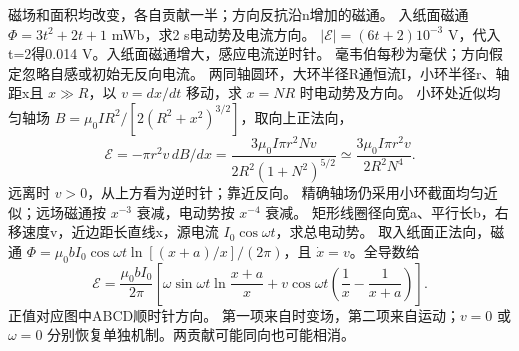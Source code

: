 \crosscheck 磁场和面积均改变，各自贡献一半；方向反抗沿n增加的磁通。
\problemtext 入纸面磁通 $\Phi=3t^2+2t+1$ mWb，求2 s电动势及电流方向。
\workings $|\mathcal E|=(6t+2)10^{-3}$ V，代入t=2得0.014 V。入纸面磁通增大，感应电流逆时针。
\crosscheck 毫韦伯每秒为毫伏；方向假定忽略自感或初始无反向电流。
\problemtext 两同轴圆环，大环半径R通恒流I，小环半径r、轴距x且 $x\gg R$，以 $v=dx/dt$ 移动，求 $x=NR$ 时电动势及方向。
\workings 小环处近似均匀轴场 $B=\mu_0IR^2/[2(R^2+x^2)^{3/2}]$，取向上正法向，
\[
\mathcal E=-\pi r^2 v\,dB/dx
=\frac{3\mu_0I\pi r^2Nv}{2R^2(1+N^2)^{5/2}}
\simeq\frac{3\mu_0I\pi r^2v}{2R^2N^4}.
\]
远离时 $v>0$，从上方看为逆时针；靠近反向。
\crosscheck 精确轴场仍采用小环截面均匀近似；远场磁通按 $x^{-3}$ 衰减，电动势按 $x^{-4}$ 衰减。
\problemtext 矩形线圈径向宽a、平行长b，右移速度v，近边距长直线x，源电流 $I_0\cos\omega t$，求总电动势。
\workings 取入纸面正法向，磁通 $\Phi=\mu_0b I_0\cos\omega t\ln[(x+a)/x]/(2\pi)$，且 $\dot x=v$。全导数给
\[
\mathcal E=\frac{\mu_0 b I_0}{2\pi}
\left[\omega\sin\omega t\ln\frac{x+a}{x}
+v\cos\omega t\left(\frac1x-\frac1{x+a}\right)\right].
\]
正值对应图中ABCD顺时针方向。
\crosscheck 第一项来自时变场，第二项来自运动；$v=0$ 或 $\omega=0$ 分别恢复单独机制。两贡献可能同向也可能相消。

